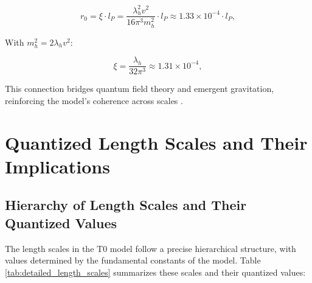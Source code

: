 \documentclass[twocolumn,aps,prl]{revtex4-2}
\begin{document}
	\begin{equation}
		r_0 = \xi \cdot l_P = \frac{\lambda_h^2 v^2}{16 \pi^3 m_h^2} \cdot l_P \approx 1.33 \times 10^{-4} \cdot l_P, \label{eq:r0_higgs}
	\end{equation}
	
	With $m_h^2 = 2 \lambda_h v^2$:
	
	\begin{equation}
		\xi = \frac{\lambda_h}{32 \pi^3} \approx 1.31 \times 10^{-4}, \label{eq:xi_higgs}
	\end{equation}
	
	This connection bridges quantum field theory and emergent gravitation, reinforcing the model’s coherence across scales \cite{pascher_higgs_2025}.
	
	\section{Quantized Length Scales and Their Implications}
	\label{sec:length_scales}
	
	\subsection{Hierarchy of Length Scales and Their Quantized Values}
	\label{subsec:detailed_length_scales}
	
	The length scales in the T0 model follow a precise hierarchical structure, with values determined by the fundamental constants of the model. Table \ref{tab:detailed_length_scales} summarizes these scales and their quantized values:
	
\end{document}

